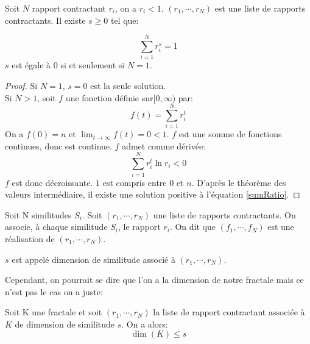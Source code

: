 \documentclass[a4paper, 12pt]{report}
\begin{document}
			\begin{theorem}
				Soit $N$ rapport contractant $r_i$, on a $r_i<1$. $(r_1,\cdots,r_N)$ est une liste de rapports contractants. Il existe $s\geq0$ tel que:
				
				\begin{equation}
					\sum_{i=1}^N r_i^s =1
				\end{equation}
				$s$ est égale à $0$ si et seulement si $N=1$.
			\end{theorem}
			\begin{proof}
				Si $N=1$, $s=0$ est la seule solution.\\
				Si $N>1$, soit $f$ une fonction définie sur$[0,\infty)$ par:
				\begin{equation}
				\label{sumRatio}
					f(t)=\sum_{i=1}^N r_i^t
				\end{equation}
				On a $f(0)=n$ et $\lim_{t\rightarrow\infty}f(t)=0<1$. $f$ est une somme de fonctions continues, donc est continue. $f$ admet comme dérivée:
				\begin{equation*}
					\sum_{i=1}^N r_i^t\ln r_i<0
				\end{equation*}
				$f$ est donc décroissante. $1$ est compris entre $0$ et $n$.
				D'après le théorème des valeurs intermédiaire, il existe une solution positive à l'équation \ref{sumRatio}.
			\end{proof}
			
			\begin{definition}
				Soit N similitudes $S_i$. Soit $(r_1,\cdots,r_N)$ une liste de rapports contractants. On associe, à chaque similitude $S_i$, le rapport $r_i$. On dit que $(f_1,\cdots,f_N)$ est une réalisation de $(r_1,\cdots,r_N)$.
			\end{definition}

			\begin{definition}
				$s$ est appelé dimension de similitude associé à $(r_1,\cdots,r_N)$.
			\end{definition}
			
			Cependant, on pourrait se dire que l'on a la dimension de notre fractale mais ce n'est pas le cas on a juste:
			\begin{remark*}
				Soit K une fractale et soit $(r_1,\cdots,r_N)$ la liste de rapport contractant associée à $K$ de dimension de similitude $s$. On a alors:
				\begin{equation*}
					\dim(K)\leq s
				\end{equation*}
			\end{remark*}
			
\end{document}
